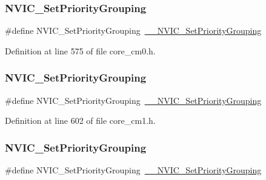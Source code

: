 \subsubsection{\texorpdfstring{N\+V\+I\+C\+\_\+\+Set\+Priority\+Grouping}{NVIC\_SetPriorityGrouping}\hspace{0.1cm}{\footnotesize\ttfamily [1/11]}}
{\footnotesize\ttfamily \#define N\+V\+I\+C\+\_\+\+Set\+Priority\+Grouping~\hyperlink{group___c_m_s_i_s___core___n_v_i_c_functions_gafc94dcbaee03e4746ade1f5bb9aaa56d}{\+\_\+\+\_\+\+N\+V\+I\+C\+\_\+\+Set\+Priority\+Grouping}}



Definition at line 575 of file core\+\_\+cm0.\+h.

\mbox{\label{group___c_m_s_i_s___core___n_v_i_c_functions_ga0e798d5aec68cdd8263db86a76df788f}} 
\subsubsection{\texorpdfstring{N\+V\+I\+C\+\_\+\+Set\+Priority\+Grouping}{NVIC\_SetPriorityGrouping}\hspace{0.1cm}{\footnotesize\ttfamily [2/11]}}
{\footnotesize\ttfamily \#define N\+V\+I\+C\+\_\+\+Set\+Priority\+Grouping~\hyperlink{group___c_m_s_i_s___core___n_v_i_c_functions_gafc94dcbaee03e4746ade1f5bb9aaa56d}{\+\_\+\+\_\+\+N\+V\+I\+C\+\_\+\+Set\+Priority\+Grouping}}



Definition at line 602 of file core\+\_\+cm1.\+h.

\mbox{\label{group___c_m_s_i_s___core___n_v_i_c_functions_ga0e798d5aec68cdd8263db86a76df788f}} 
\subsubsection{\texorpdfstring{N\+V\+I\+C\+\_\+\+Set\+Priority\+Grouping}{NVIC\_SetPriorityGrouping}\hspace{0.1cm}{\footnotesize\ttfamily [3/11]}}
{\footnotesize\ttfamily \#define N\+V\+I\+C\+\_\+\+Set\+Priority\+Grouping~\hyperlink{group___c_m_s_i_s___core___n_v_i_c_functions_gafc94dcbaee03e4746ade1f5bb9aaa56d}{\+\_\+\+\_\+\+N\+V\+I\+C\+\_\+\+Set\+Priority\+Grouping}}



